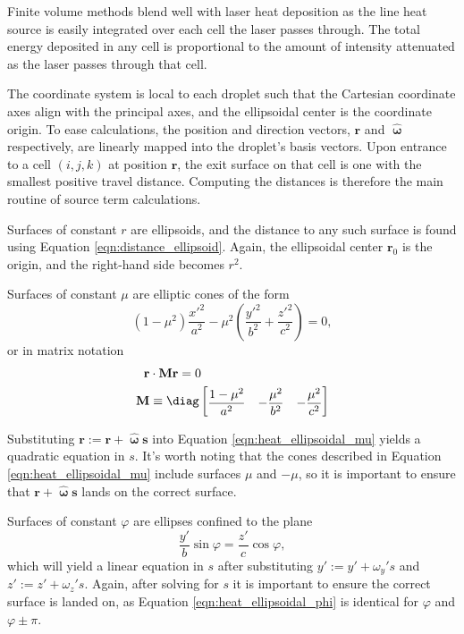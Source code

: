 Finite volume methods blend well with laser heat deposition as the line heat source is easily integrated over each cell the laser passes through. The total energy deposited in any cell is proportional to the amount
of intensity attenuated as the laser passes through that cell.

The coordinate system is local to each droplet such that the Cartesian coordinate axes align with the principal axes, and the ellipsoidal center is the coordinate origin. To ease calculations, the position and direction
vectors, $\mathbf{r}$ and $\mathbf{\hat{\upomega}}$ respectively, are linearly mapped into the droplet's basis vectors. Upon entrance to a cell $(i,j,k)$ at position $\mathbf{r}$, the exit surface on that cell is one with the
smallest positive travel distance. Computing the distances is therefore the main routine of source term calculations.

Surfaces of constant $r$ are ellipsoids, and the distance to any such surface is found using Equation \ref{eqn:distance_ellipsoid}. Again, the ellipsoidal center $\mathbf{r}_0$ is the origin, and the right-hand side
becomes $r^2$.

Surfaces of constant $\mu$ are elliptic cones of the form
\begin{equation}
    (1-\mu^2) \frac{x'^2}{a^2} - \mu^2 \left( \frac{y'^2}{b^2} + \frac{z'^2}{c^2} \right) = 0,
\end{equation}
or in matrix notation
\begin{subequations}
    \label{eqn:heat_ellipsoidal_mu}
    \begin{align}
        \mathbf{r} &\cdot \mathbf{M}\mathbf{r} = 0 \\
        \mathbf{M} &\equiv \diag
            \begin{bmatrix}
                \displaystyle \frac{1-\mu^2}{a^2} & \displaystyle -\frac{\mu^2}{b^2} & \displaystyle -\frac{\mu^2}{c^2}
            \end{bmatrix}
    \end{align}
\end{subequations}

Substituting $\mathbf{r} := \mathbf{r} + \mathbf{\hat{\upomega}s}$ into Equation \ref{eqn:heat_ellipsoidal_mu} yields a quadratic equation in $s$. It's worth noting that the cones described in Equation
\ref{eqn:heat_ellipsoidal_mu} include surfaces $\mu$ and $-\mu$, so it is important to ensure that $\mathbf{r} + \mathbf{\hat{\upomega}s}$ lands on the correct surface.

Surfaces of constant $\varphi$ are ellipses confined to the plane
\begin{equation}
    \frac{y'}{b} \sin\varphi = \frac{z'}{c} \cos\varphi,
    \label{eqn:heat_ellipsoidal_phi}
\end{equation}
which will yield a linear equation in $s$ after substituting $y' := y' + \omega_y' s$ and $z' := z' + \omega_z' s$. Again, after solving for $s$ it is important to ensure the correct surface is
landed on, as Equation \ref{eqn:heat_ellipsoidal_phi} is identical for $\varphi$ and $\varphi \pm \pi$.

